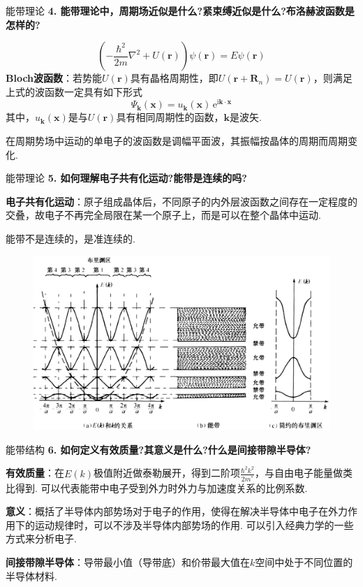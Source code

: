 \documentclass{beamer}
\begin{document}
\begin{frame}[t]{能带理论}
    \textbf{4. 能带理论中，周期场近似是什么?紧束缚近似是什么?布洛赫波函数是怎样的?}\par
    \vspace{-0.2cm}
    \[
    \left(-\frac{\hbar^2}{2m}\nabla^2+U(\boldsymbol{r})\right)\psi(\boldsymbol{r})=E\psi(\boldsymbol{r})
    \]
    \textbf{Bloch波函数}：若势能$U(\boldsymbol{r})$具有晶格周期性，即$U(\boldsymbol{r}+\boldsymbol{R}_n)=U(\boldsymbol{r})$，则满足上式的波函数一定具有如下形式
    \[
    \varPsi_{\boldsymbol{k}}(\boldsymbol{x})=u_{\boldsymbol{k}}(\boldsymbol{x}) \, \text{e}^{\text{i} \boldsymbol{k} \cdot \boldsymbol{x}}
    \]
    其中，$u_{\boldsymbol{k}} (\boldsymbol{x})$是与$U(\boldsymbol{r})$具有相同周期性的函数，$\boldsymbol{k}$是波矢.\par
    在周期势场中运动的单电子的波函数是调幅平面波，其振幅按晶体的周期而周期变化.
\end{frame}

\begin{frame}[t]{能带理论}
    \textbf{5. 如何理解电子共有化运动?能带是连续的吗?}\par
    \vspace{0.1cm}
    \textbf{电子共有化运动}：原子组成晶体后，不同原子的内外层波函数之间存在一定程度的交叠，故电子不再完全局限在某一个原子上，而是可以在整个晶体中运动. \par
    \vspace{0.1cm}
    能带不是连续的，是准连续的.
    \vspace{-0.1cm}
    \begin{figure}
        \centering
        \includegraphics[width=0.6\linewidth]{3.png}
    \end{figure}
    \end{frame}

\begin{frame}[t]{能带结构}
    \textbf{6. 如何定义有效质量?其意义是什么?什么是间接带隙半导体?}\par
    \vspace{0.2cm}
    \textbf{有效质量}：在$E(k)$极值附近做泰勒展开，得到二阶项$\frac{\hbar ^2 k^2}{2m^*}$，与自由电子能量做类比得到. 可以代表能带中电子受到外力时外力与加速度关系的比例系数. \par
    \vspace{0.1cm}
    \textbf{意义}：概括了半导体内部势场对于电子的作用，使得在解决半导体中电子在外力作用下的运动规律时，可以不涉及半导体内部势场的作用. 可以引入经典力学的一些方式来分析电子.\par
    \vspace{0.1cm}
    \textbf{间接带隙半导体}：导带最小值（导带底）和价带最大值在$k$空间中处于不同位置的半导体材料.
    
\end{frame}
\end{document}
